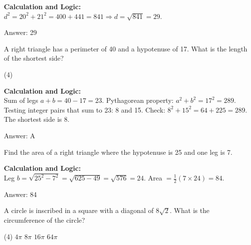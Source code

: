 \documentclass[11pt,paper=a4,answers]{exam}
\begin{document}
\begin{questions}
\begin{solution}
\textbf{Calculation and Logic:} \\
$d^2 = 20^2 + 21^2 = 400 + 441 = 841 \Rightarrow d = \sqrt{841} = 29$.

\vspace{30pt}

Answer: \colorbox{yellow!100}{29}
\end{solution}

\vspace{60pt}

\question
A right triangle has a perimeter of 40 and a hypotenuse of 17. What is the length of the shortest side?
\begin{tasks}(4)
\end{tasks}

\begin{solution}
\textbf{Calculation and Logic:} \\
Sum of legs $a+b = 40 - 17 = 23$. Pythagorean property: $a^2 + b^2 = 17^2 = 289$. Testing integer pairs that sum to 23: 8 and 15. Check: $8^2 + 15^2 = 64 + 225 = 289$. The shortest side is 8.

\vspace{30pt}

Answer: \colorbox{yellow!100}{A}
\end{solution}

\vspace{60pt}

\question
Find the area of a right triangle where the hypotenuse is 25 and one leg is 7.

\begin{solution}
\textbf{Calculation and Logic:} \\
Leg $b = \sqrt{25^2 - 7^2} = \sqrt{625 - 49} = \sqrt{576} = 24$. Area $= \frac{1}{2}(7 \times 24) = 84$.

\vspace{30pt}

Answer: \colorbox{yellow!100}{84}
\end{solution}

\vspace{60pt}

\question
A circle is inscribed in a square with a diagonal of $8\sqrt{2}$. What is the circumference of the circle?
\begin{tasks}(4)
    \task $4\pi$
    \task $8\pi$
    \task $16\pi$
    \task $64\pi$
\end{tasks}


\end{questions}
\end{document}
